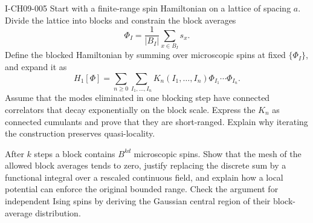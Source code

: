 \begin{exercise}{I-CH09-005}
Start with a finite-range spin Hamiltonian on a lattice of spacing $a$.  Divide
the lattice into blocks and constrain the block averages
\[
  \Phi_I=\frac{1}{|B_I|}\sum_{x\in B_I}s_x.
\]
Define the blocked Hamiltonian by summing over microscopic spins at fixed
$\{\Phi_I\}$, and expand it as
\[
  H_1[\Phi]=\sum_{n\geq0}\sum_{I_1,\ldots,I_n}
  K_n(I_1,\ldots,I_n)\Phi_{I_1}\cdots\Phi_{I_n}.
\]
Assume that the modes eliminated in one blocking step have connected
correlators that decay exponentially on the block scale.  Express the
$K_n$ as connected cumulants and prove that they are short-ranged.  Explain
why iterating the construction preserves quasi-locality.

After $k$ steps a block contains $B^{kd}$ microscopic spins.  Show that the
mesh of the allowed block averages tends to zero, justify replacing the
discrete sum by a functional integral over a rescaled continuous field, and
explain how a local potential can enforce the original bounded range.  Check
the argument for independent Ising spins by deriving the Gaussian central
region of their block-average distribution.
\end{exercise}
